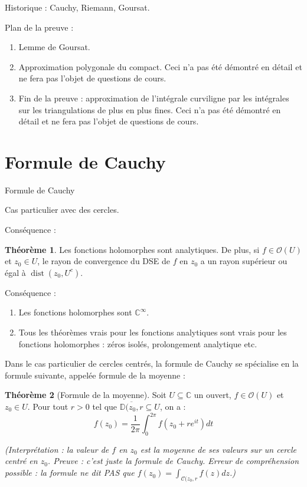 \documentclass[11pt,a4paper]{book}
\newcommand{\D}{\mathbb{D}}
\newcommand{\C}{\mathbb{C}}
\theoremstyle{definition}
\newtheorem{theoreme}{Th\'eor\`eme}[section]
\theoremstyle{plain}
\begin{document}
Historique : Cauchy, Riemann, Goursat.

Plan de la preuve : 
\begin{enumerate}
\item Lemme de Goursat.
\item Approximation polygonale du compact. Ceci n'a pas été démontré en détail et ne fera pas l'objet de questions de cours.
\item Fin de la preuve : approximation de l'intégrale curviligne par les intégrales sur les triangulations de plus en plus fines.  Ceci n'a pas été démontré en détail et ne fera pas l'objet de questions de cours.
\end{enumerate}






\section{Formule de Cauchy}

Formule de Cauchy


Cas particulier avec des cercles.

Conséquence : 

\begin{theoreme}
Les fonctions holomorphes sont analytiques.
De plus, si $f\in \mathcal O(U)$ et $z_0 \in U$, le rayon de convergence du DSE de $f$ en $z_0$ a un rayon supérieur ou égal à $\operatorname{dist}(z_0,U^c)$.
\end{theoreme}

Conséquence : 
\begin{enumerate}
\item Les fonctions holomorphes sont $\C^\infty$.
\item Tous les théorèmes vrais pour les fonctions analytiques sont vrais pour les fonctions holomorphes : zéros isolés, prolongement analytique etc.
\end{enumerate}

Dans le cas particulier de cercles centrés, la formule de Cauchy se spécialise en la formule suivante, appelée formule de la moyenne : 
\begin{theoreme}[Formule de la moyenne]
Soit $U\subseteq \C$ un ouvert,  $f \in \mathcal O(U)$ et $z_0\in U$.
Pour tout $r>0$ tel que $\overline{\D(z_0,r} \subseteq U$, on a :
\[ f(z_0) = \frac{1}{2\pi}\int_0^{2\pi} f\left(z_0+re^{it}\right)dt\]
\end{theoreme}
\emph{(Interprétation : la valeur de $f$ en $z_0$ est la moyenne de ses valeurs sur un cercle centré en $z_0$. 
Preuve : c'est juste la formule de Cauchy. 
Erreur de compréhension possible : la formule ne dit PAS que $f(z_0)=\int_{\mathcal C(z_0,r} f(z)dz$.)}
\end{document}
